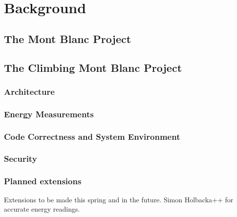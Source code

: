 \chapter{Background}
\label{ch:background}

\section{The Mont Blanc Project}

\section{The Climbing Mont Blanc Project}

\subsection{Architecture}

\subsection{Energy Measurements}

\subsection{Code Correctness and System Environment}

\subsection{Security}

\subsection{Planned extensions}
Extensions to be made this spring and in the future.
Simon Holbacka++ for accurate energy readings.

